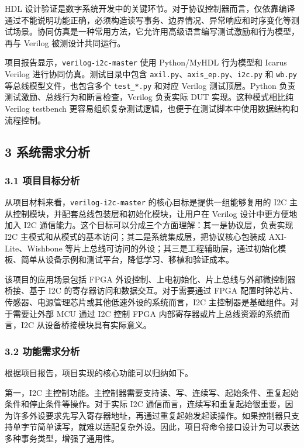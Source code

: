 HDL 设计验证是数字系统开发中的关键环节。对于协议控制器而言，仅依靠编译通过不能说明功能正确，必须构造读写事务、边界情况、异常响应和时序变化等测试场景。协同仿真是一种常用方法，它允许用高级语言编写测试激励和行为模型，再与 Verilog 被测设计共同运行。

项目报告显示，\texttt{verilog-i2c-master} 使用 Python/MyHDL 行为模型和 Icarus Verilog 进行协同仿真。测试目录中包含 \texttt{axil.py}、\texttt{axis\_ep.py}、\texttt{i2c.py} 和 \texttt{wb.py} 等总线模型文件，也包含多个 \texttt{test\_*.py} 和对应 Verilog 测试顶层。Python 负责测试激励、总线行为和断言检查，Verilog 负责实际 DUT 实现。这种模式相比纯 Verilog testbench 更容易组织复杂测试逻辑，也便于在测试脚本中使用数据结构和流程控制。

\subsection{3 系统需求分析}\label{ux7cfbux7edfux9700ux6c42ux5206ux6790}

\subsubsection{3.1 项目目标分析}\label{ux9879ux76eeux76eeux6807ux5206ux6790}

从项目材料来看，\texttt{verilog-i2c-master} 的核心目标是提供一组能够复用的 I2C 主从控制模块，并配套总线包装层和初始化模块，让用户在 Verilog 设计中更方便地加入 I2C 通信能力。这个目标可以分成三个方面理解：其一是协议层，负责实现 I2C 主模式和从模式的基本访问；其二是系统集成层，把协议核心包装成 AXI-Lite、Wishbone 等片上总线可访问的外设；其三是工程辅助层，通过初始化模板、简单从设备示例和测试平台，降低学习、移植和验证成本。

该项目的应用场景包括 FPGA 外设控制、上电初始化、片上总线与外部微控制器桥接、基于 I2C 的寄存器访问和数据交互。对于需要通过 FPGA 配置时钟芯片、传感器、电源管理芯片或其他低速外设的系统而言，I2C 主控制器是基础组件。对于需要让外部 MCU 通过 I2C 控制 FPGA 内部寄存器或片上总线资源的系统而言，I2C 从设备桥接模块具有实际意义。

\subsubsection{3.2 功能需求分析}\label{ux529fux80fdux9700ux6c42ux5206ux6790}

根据项目报告，项目实现的核心功能可以归纳如下。

第一，I2C 主控制功能。主控制器需要支持读、写、连续写、起始条件、重复起始条件和停止条件等操作。对于实际 I2C 通信而言，连续写和重复起始很重要，因为许多外设要求先写入寄存器地址，再通过重复起始发起读操作。如果控制器只支持单字节简单读写，就难以适配复杂外设。因此，项目将命令接口设计为可以表达多种事务类型，增强了通用性。


